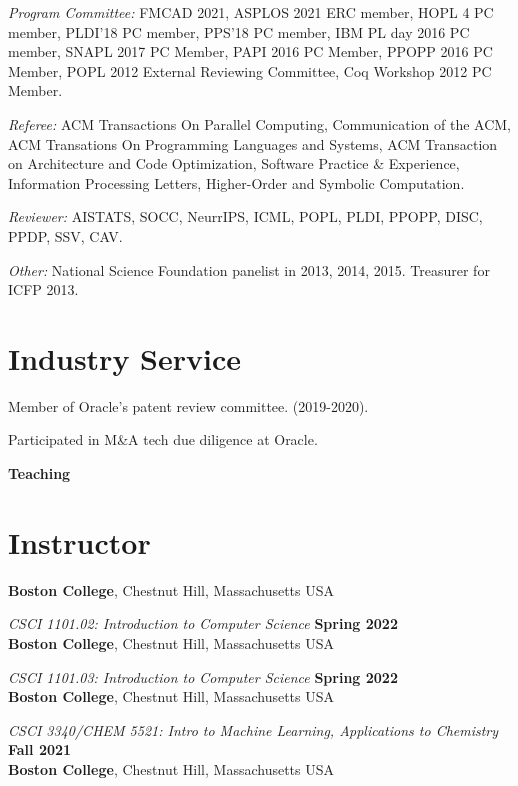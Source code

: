 \documentclass[margin,line]{res}
\begin{document}
\begin{resume}
{\em Program Committee:} FMCAD 2021, ASPLOS 2021 ERC member, HOPL 4 PC member,
PLDI'18 PC member, PPS'18 PC member, IBM PL day 2016 PC member, SNAPL
2017 PC Member, PAPI 2016 PC Member, PPOPP 2016 PC Member, POPL 2012
External Reviewing Committee, Coq Workshop 2012 PC Member.

{\em Referee:} ACM Transactions On Parallel Computing, Communication of the ACM, ACM Transations On Programming Languages and Systems, ACM Transaction on Architecture and Code Optimization, 
Software Practice \& Experience, Information Processing Letters, Higher-Order and Symbolic Computation.

{\em Reviewer:} AISTATS, SOCC, NeurrIPS, ICML, POPL, PLDI, PPOPP, DISC, PPDP, SSV,
CAV.

{\em Other:} National Science Foundation panelist in 2013, 2014, 2015. Treasurer for ICFP 2013.

\section{\sc Industry Service}

Member of Oracle's patent review committee. (2019-2020).

Participated in M\&A tech due diligence at Oracle.

\newpage
  {\bf {\Large Teaching}}

\section{\sc Instructor}

{\bf Boston College}, Chestnut Hill, Massachusetts USA
\vspace{-.4cm}

{\em CSCI 1101.02: Introduction  to Computer Science} \hfill {\bf Spring 2022}\\
{\bf Boston College}, Chestnut Hill, Massachusetts USA
\vspace{-.4cm}

{\em CSCI 1101.03: Introduction  to Computer Science} \hfill {\bf Spring 2022}\\
{\bf Boston College}, Chestnut Hill, Massachusetts USA
\vspace{-.4cm}

{\em CSCI 3340/CHEM 5521: Intro to Machine Learning, Applications to Chemistry} \hfill {\bf Fall 2021}\\
{\bf Boston College}, Chestnut Hill, Massachusetts USA
\vspace{-.4cm}


\end{resume}
\end{document}
